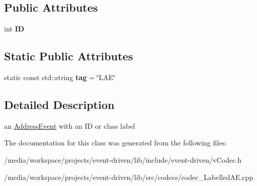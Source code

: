 \subsection*{Public Attributes}
\begin{DoxyCompactItemize}
\item 
\mbox{\label{classev_1_1LabelledAE_a59a295976cdf867006deea22d7cf1942}} 
int {\bfseries ID}
\end{DoxyCompactItemize}
\subsection*{Static Public Attributes}
\begin{DoxyCompactItemize}
\item 
\mbox{\label{classev_1_1LabelledAE_a825f9f0819046248ce7f6d0af4871cec}} 
static const std\+::string {\bfseries tag} = \char`\"{}L\+AE\char`\"{}
\end{DoxyCompactItemize}


\subsection{Detailed Description}
an \hyperlink{classev_1_1AddressEvent}{Address\+Event} with an ID or class label 

The documentation for this class was generated from the following files\+:\begin{DoxyCompactItemize}
\item 
/media/workspace/projects/event-\/driven/lib/include/event-\/driven/v\+Codec.\+h\item 
/media/workspace/projects/event-\/driven/lib/src/codecs/codec\+\_\+\+Labelled\+A\+E.\+cpp\end{DoxyCompactItemize}
